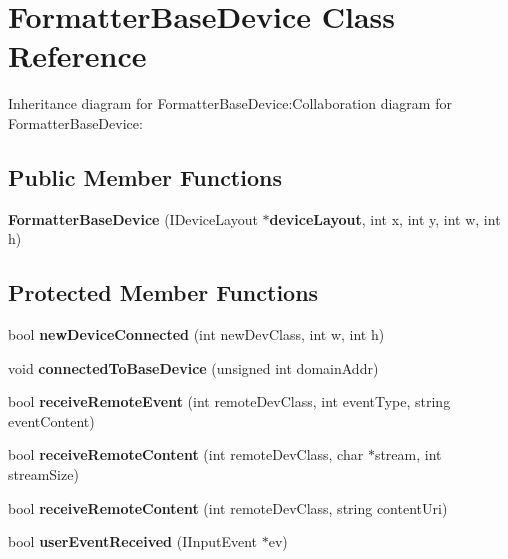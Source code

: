 \section{FormatterBaseDevice Class Reference}
\label{classbr_1_1pucrio_1_1telemidia_1_1ginga_1_1ncl_1_1multidevice_1_1FormatterBaseDevice}
Inheritance diagram for FormatterBaseDevice:Collaboration diagram for FormatterBaseDevice:\subsection*{Public Member Functions}
\begin{CompactItemize}
\item 
\textbf{FormatterBaseDevice} (IDeviceLayout $\ast${\bf deviceLayout}, int x, int y, int w, int h)\label{classbr_1_1pucrio_1_1telemidia_1_1ginga_1_1ncl_1_1multidevice_1_1FormatterBaseDevice_08ae9c8e917663f55d682fd31801b6fb}

\end{CompactItemize}
\subsection*{Protected Member Functions}
\begin{CompactItemize}
\item 
bool \textbf{newDeviceConnected} (int newDevClass, int w, int h)\label{classbr_1_1pucrio_1_1telemidia_1_1ginga_1_1ncl_1_1multidevice_1_1FormatterBaseDevice_4820c061de3b177c376e96dd45c4fca0}

\item 
void {\bf connectedToBaseDevice} (unsigned int domainAddr)\label{classbr_1_1pucrio_1_1telemidia_1_1ginga_1_1ncl_1_1multidevice_1_1FormatterBaseDevice_f7e3b3635d3e38bed8ead0321733791b}

\item 
bool \textbf{receiveRemoteEvent} (int remoteDevClass, int eventType, string eventContent)\label{classbr_1_1pucrio_1_1telemidia_1_1ginga_1_1ncl_1_1multidevice_1_1FormatterBaseDevice_d0ee06b25589fbeea9b03c945ff41b29}

\item 
bool {\bf receiveRemoteContent} (int remoteDevClass, char $\ast$stream, int streamSize)\label{classbr_1_1pucrio_1_1telemidia_1_1ginga_1_1ncl_1_1multidevice_1_1FormatterBaseDevice_f4051428a3f94469cac462ee8e875bd5}

\item 
bool {\bf receiveRemoteContent} (int remoteDevClass, string contentUri)\label{classbr_1_1pucrio_1_1telemidia_1_1ginga_1_1ncl_1_1multidevice_1_1FormatterBaseDevice_a70ef1a18d742b5c8d124330f1c37871}

\item 
bool \textbf{userEventReceived} (IInputEvent $\ast$ev)\label{classbr_1_1pucrio_1_1telemidia_1_1ginga_1_1ncl_1_1multidevice_1_1FormatterBaseDevice_1520ea57105d2db3e7f818b4d60667af}

\end{CompactItemize}


